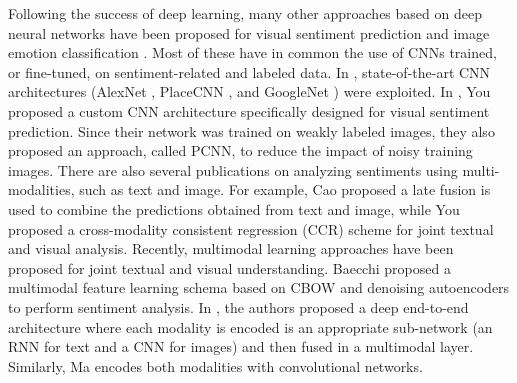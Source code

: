 Following the success of deep learning, many other approaches based on deep neural networks have been proposed for visual sentiment prediction and image emotion classification
\cite{Campos2017,Chen2014:DeepSentiBank,Islam2016,Rao2016,You2015:Robust}. %
Most of these have in common the use of CNNs trained, or fine-tuned, on sentiment-related and labeled data. In \cite{Campos2017,Chen2014:DeepSentiBank,Islam2016,Jou2015:VisualAffect}, %
state-of-the-art CNN architectures (\eg AlexNet \cite{krizhevsky2012imagenet}, PlaceCNN \cite{zhou2014}, and GoogleNet \cite{Szegedy2015:GooleNet}) were exploited.
In \cite{You2015:Robust}, You \etal proposed a custom CNN architecture specifically designed for visual sentiment prediction. Since their network was trained on weakly labeled images, they also proposed an approach, called PCNN, to reduce the impact of noisy training images. %
There are also several publications on analyzing sentiments using multi-modalities, such as text and image. For example, Cao \etal \cite{Cao2016} proposed
a late fusion is used to combine the predictions obtained from text and image, while You \etal \cite{You2016:Cross-modality} proposed a cross-modality consistent regression (CCR) scheme for joint textual and visual analysis.
Recently, multimodal learning approaches have been proposed for joint textual and visual understanding. Baecchi \etal \cite{baecchi2016multimodal} proposed a multimodal feature learning schema based on CBOW and denoising autoencoders to perform sentiment analysis. In \cite{mao2014deep}, the authors proposed a deep end-to-end architecture where each modality is encoded is an appropriate sub-network (an RNN for text and a CNN for images) and then fused in a multimodal layer. Similarly, Ma \etal \cite{ma2015multimodal} encodes both modalities with convolutional networks.


